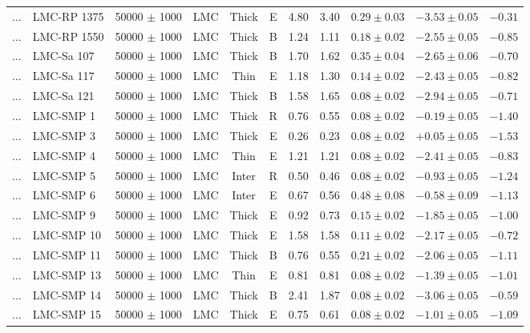 \documentclass[useAMS]{mn2e}
\begin{document}
\begin{center}
{\begin{longtable}{llccccccccc}
$\ldots$	&	LMC-RP 1375	&	50000 $\pm$ 1000	&	LMC	&	Thick	&	E	&	4.80	&	3.40	&	$0.29 \pm  0.03$	&	$-3.53 \pm 0.05$	&	$-0.31$	\\
$\ldots$	&	LMC-RP 1550	&	50000 $\pm$ 1000	&	LMC	&	Thick	&	B	&	1.24	&	1.11	&	$0.18 \pm  0.02$	&	$-2.55 \pm 0.05$	&	$-0.85$	\\
$\ldots$	&	LMC-Sa 107	&	50000 $\pm$ 1000	&	LMC	&	Thick	&	B	&	1.70	&	1.62	&	$0.35 \pm  0.04$	&	$-2.65 \pm 0.06$	&	$-0.70$	\\
$\ldots$	&	LMC-Sa 117	&	50000 $\pm$ 1000	&	LMC	&	Thin	&	E	&	1.18	&	1.30	&	$0.14 \pm  0.02$	&	$-2.43 \pm 0.05$	&	$-0.82$	\\
$\ldots$	&	LMC-Sa 121	&	50000 $\pm$ 1000	&	LMC	&	Thick	&	B	&	1.58	&	1.65	&	$0.08 \pm  0.02$	&	$-2.94 \pm 0.05$	&	$-0.71$	\\
$\ldots$	&	LMC-SMP 1	&	50000 $\pm$ 1000	&	LMC	&	Thick	&	R	&	0.76	&	0.55	&	$0.08 \pm  0.02$	&	$-0.19 \pm 0.05$	&	$-1.40$	\\
$\ldots$	&	LMC-SMP 3	&	50000 $\pm$ 1000	&	LMC	&	Thick	&	E	&	0.26	&	0.23	&	$0.08 \pm  0.02$	&	$+0.05 \pm 0.05$	&	$-1.53$	\\
$\ldots$	&	LMC-SMP 4	&	50000 $\pm$ 1000	&	LMC	&	Thin	&	E	&	1.21	&	1.21	&	$0.08 \pm  0.02$	&	$-2.41 \pm 0.05$	&	$-0.83$	\\
$\ldots$	&	LMC-SMP 5	&	50000 $\pm$ 1000	&	LMC	&	Inter	&	R	&	0.50	&	0.46	&	$0.08 \pm  0.02$	&	$-0.93 \pm 0.05$	&	$-1.24$	\\
$\ldots$	&	LMC-SMP 6	&	50000 $\pm$ 1000	&	LMC	&	Inter	&	E	&	0.67	&	0.56	&	$0.48 \pm  0.08$	&	$-0.58 \pm 0.09$	&	$-1.13$	\\
$\ldots$	&	LMC-SMP 9	&	50000 $\pm$ 1000	&	LMC	&	Thick	&	E	&	0.92	&	0.73	&	$0.15 \pm  0.02$	&	$-1.85 \pm 0.05$	&	$-1.00$	\\
$\ldots$	&	LMC-SMP 10	&	50000 $\pm$ 1000	&	LMC	&	Thick	&	E	&	1.58	&	1.58	&	$0.11 \pm  0.02$	&	$-2.17 \pm 0.05$	&	$-0.72$	\\
$\ldots$	&	LMC-SMP 11	&	50000 $\pm$ 1000	&	LMC	&	Thick	&	B	&	0.76	&	0.55	&	$0.21 \pm  0.02$	&	$-2.06 \pm 0.05$	&	$-1.11$	\\
$\ldots$	&	LMC-SMP 13	&	50000 $\pm$ 1000	&	LMC	&	Thin	&	E	&	0.81	&	0.81	&	$0.08 \pm  0.02$	&	$-1.39 \pm 0.05$	&	$-1.01$	\\
$\ldots$	&	LMC-SMP 14	&	50000 $\pm$ 1000	&	LMC	&	Thick	&	B	&	2.41	&	1.87	&	$0.08 \pm  0.02$	&	$-3.06 \pm 0.05$	&	$-0.59$	\\
$\ldots$	&	LMC-SMP 15	&	50000 $\pm$ 1000	&	LMC	&	Thick	&	E	&	0.75	&	0.61	&	$0.08 \pm  0.02$	&	$-1.01 \pm 0.05$	&	$-1.09$	\\

\end{longtable}}
\end{center}
\end{document}
